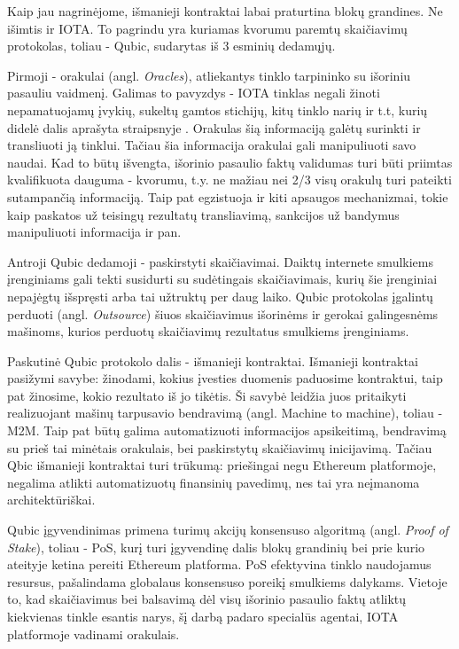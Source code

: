 
Kaip jau nagrinėjome, išmanieji kontraktai labai praturtina blokų grandines. Ne išimtis ir IOTA. To pagrindu yra kuriamas kvorumu paremtų skaičiavimų protokolas, toliau - Qubic, sudarytas iš 3 esminių dedamųjų.

Pirmoji - orakulai (angl. \textit{Oracles}), atliekantys tinklo tarpininko su išoriniu pasauliu vaidmenį. Galimas to pavyzdys - IOTA tinklas negali žinoti nepamatuojamų įvykių, sukeltų gamtos stichijų, kitų tinklo narių ir t.t, kurių didelė dalis aprašyta straipsnyje \cite{behdani2012handle}. Orakulas šią informaciją galėtų surinkti ir transliuoti ją tinklui. Tačiau šia informacija orakulai gali manipuliuoti savo naudai. Kad to būtų išvengta, išorinio pasaulio faktų validumas turi būti priimtas kvalifikuota dauguma - kvorumu, t.y. ne mažiau nei 2/3 visų orakulų turi pateikti sutampančią informaciją. Taip pat egzistuoja ir kiti apsaugos mechanizmai, tokie kaip paskatos už teisingų rezultatų transliavimą, sankcijos už bandymus manipuliuoti informacija ir pan.

Antroji Qubic dedamoji - paskirstyti skaičiavimai. Daiktų internete smulkiems įrenginiams gali tekti susidurti su sudėtingais skaičiavimais, kurių šie įrenginiai nepajėgtų išspręsti arba tai užtruktų per daug laiko. Qubic protokolas įgalintų perduoti (angl. \textit{Outsource}) šiuos skaičiavimus išorinėms ir gerokai galingesnėms mašinoms, kurios perduotų skaičiavimų rezultatus smulkiems įrenginiams.

Paskutinė Qubic protokolo dalis - išmanieji kontraktai. Išmanieji kontraktai pasižymi savybe: žinodami, kokius įvesties duomenis paduosime kontraktui, taip pat žinosime, kokio rezultato iš jo tikėtis. Ši savybė leidžia juos pritaikyti realizuojant mašinų tarpusavio bendravimą (angl. Machine to machine), toliau - M2M. Taip pat būtų galima automatizuoti informacijos apsikeitimą, bendravimą su prieš tai minėtais orakulais, bei paskirstytų skaičiavimų inicijavimą. Tačiau Qbic išmanieji kontraktai turi trūkumą: priešingai negu Ethereum platformoje, negalima atlikti automatizuotų finansinių pavedimų, nes tai yra neįmanoma architektūriškai.

Qubic įgyvendinimas primena turimų akcijų konsensuso algoritmą (angl. \textit{Proof of Stake}), toliau - PoS, kurį turi įgyvendinę dalis blokų grandinių bei prie kurio ateityje ketina pereiti Ethereum platforma. PoS efektyvina tinklo naudojamus resursus, pašalindama globalaus konsensuso poreikį smulkiems dalykams. Vietoje to, kad skaičiavimus bei balsavimą dėl visų išorinio pasaulio faktų atliktų kiekvienas tinkle esantis narys, šį darbą padaro specialūs agentai, IOTA platformoje vadinami orakulais.



